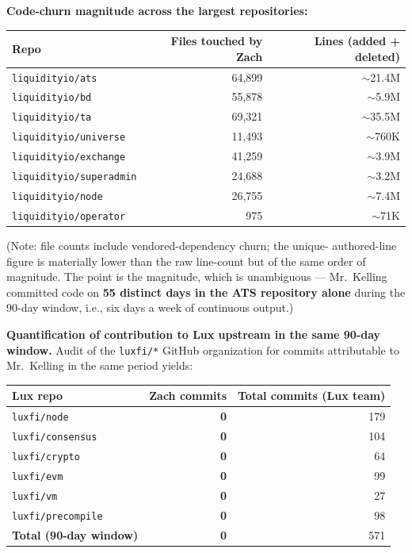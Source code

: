 \documentclass[11pt,letterpaper]{article}
\begin{document}
\textbf{Code-churn magnitude across the largest repositories:}

\begin{center}
\begin{small}
\begin{tabular}{lrr}
\toprule
\textbf{Repo} & \textbf{Files touched by Zach} & \textbf{Lines (added + deleted)} \\
\midrule
\texttt{liquidityio/ats}        & 64{,}899 & $\sim$21.4M \\
\texttt{liquidityio/bd}         & 55{,}878 & $\sim$5.9M \\
\texttt{liquidityio/ta}         & 69{,}321 & $\sim$35.5M \\
\texttt{liquidityio/universe}   & 11{,}493 & $\sim$760K \\
\texttt{liquidityio/exchange}   & 41{,}259 & $\sim$3.9M \\
\texttt{liquidityio/superadmin} & 24{,}688 & $\sim$3.2M \\
\texttt{liquidityio/node}       & 26{,}755 & $\sim$7.4M \\
\texttt{liquidityio/operator}   & 975      & $\sim$71K \\
\bottomrule
\end{tabular}
\end{small}
\end{center}

(Note: file counts include vendored-dependency churn; the unique-
authored-line figure is materially lower than the raw line-count but
of the same order of magnitude. The point is the magnitude, which
is unambiguous --- Mr.\ Kelling committed code on \textbf{55 distinct
days in the ATS repository alone} during the 90-day window, i.e.,
six days a week of continuous output.)

\textbf{Quantification of contribution to Lux upstream in the same
90-day window.} Audit of the \texttt{luxfi/*} GitHub organization for
commits attributable to Mr.\ Kelling in the same period yields:

\begin{center}
\begin{small}
\begin{tabular}{lrr}
\toprule
\textbf{Lux repo} & \textbf{Zach commits} & \textbf{Total commits (Lux team)} \\
\midrule
\texttt{luxfi/node}             & \textbf{0} & 179 \\
\texttt{luxfi/consensus}        & \textbf{0} & 104 \\
\texttt{luxfi/crypto}           & \textbf{0} & 64 \\
\texttt{luxfi/evm}              & \textbf{0} & 99 \\
\texttt{luxfi/vm}               & \textbf{0} & 27 \\
\texttt{luxfi/precompile}       & \textbf{0} & 98 \\
\midrule
\textbf{Total (90-day window)}  & \textbf{0} & 571 \\
\bottomrule
\end{tabular}
\end{small}
\end{center}
\end{document}
